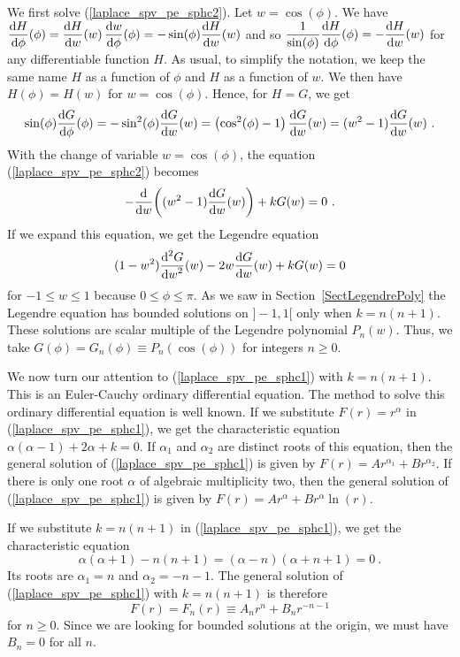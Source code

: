 \begin{egg}
We first solve (\ref{laplace_spv_pe_sphc2}).  Let $w = \cos(\phi)$.
We have \\
$\displaystyle \dydx{H}{\phi}(\phi) = \dydx{H}{w}(w)\, \dydx{w}{\phi}(\phi)
= -\sin(\phi) \dydx{H}{w}(w)$
and so
$\displaystyle \frac{1}{\sin(\phi)} \dydx{H}{\phi}(\phi) = -\dydx{H}{w}(w)$
for any differentiable function $H$.  As usual, to simplify the notation, we
keep the same name $H$ as a function of $\phi$ and $H$ as a function of
$w$.  We then have $H(\phi) = H(w)$ for $w=\cos(\phi)$.
Hence, for $H=G$, we get
\[
\sin(\phi) \dydx{G}{\phi}(\phi) = - \sin^2(\phi) \dydx{G}{w}(w)
= \left( \cos^2(\phi) - 1 \right) \dydx{G}{w}(w)
= (w^2-1)  \dydx{G}{w}(w) \ .
\]
With the change of variable $w = \cos(\phi)$, the equation
(\ref{laplace_spv_pe_sphc2}) becomes
\[
- \dfdx{ \left( (w^2-1) \dydx{G}{w}(w) \right) }{w} + k G(w) = 0 \ .
\]
If we expand this equation, we get the Legendre equation
\[
(1-w^2) \dydxn{G}{w}{2}(w) -2 w \dydx{G}{w}(w) + k G(w) = 0
\]
for $-1 \leq w \leq 1$ because $0 \leq \phi \leq \pi$.  As we saw in
Section~\ref{SectLegendrePoly}
the Legendre equation has bounded solutions on $]-1,1[$ only when
$k=n(n+1)$.  These solutions are scalar
multiple of the Legendre polynomial $P_n(w)$. Thus, we take
$G(\phi) = G_n(\phi) \equiv P_n(\cos(\phi))$ for integers $n \geq 0$.

We now turn our attention to (\ref{laplace_spv_pe_sphc1}) with $k=n(n+1)$.
This is an Euler-Cauchy ordinary differential equation.  The method to
solve this ordinary differential equation is well known.  If we
substitute $F(r) = r^\alpha$ in
(\ref{laplace_spv_pe_sphc1}), we get the characteristic equation
$\alpha(\alpha-1) + 2 \alpha + k=0$.  If $\alpha_1$ and $\alpha_2$ are
distinct roots of this equation, then the general solution of
(\ref{laplace_spv_pe_sphc1}) is given by
$F(r) = A r^{\alpha_1} + B r^{\alpha_2}$.  If there is only one root
$\alpha$ of algebraic multiplicity two, then the general solution of
(\ref{laplace_spv_pe_sphc1}) is given by
$F(r) = A r^{\alpha} + B r^{\alpha}\ln(r)$.

If we substitute $k=n(n+1)$ in (\ref{laplace_spv_pe_sphc1}), we get
the characteristic equation
\[
\alpha(\alpha+1) - n(n+1) = (\alpha-n)(\alpha+n+1) = 0 \ .
\]
Its roots are $\alpha_1 = n$ and $\alpha_2 = -n-1$.  The general
solution of (\ref{laplace_spv_pe_sphc1}) with $k=n(n+1)$ is therefore
\begin{equation} \label{laplace_spv_pe_sphc3}
F(r) = F_n(r) \equiv A_n r^n + B_n r^{-n-1}
\end{equation}
for $n \geq 0$.  Since we are looking for bounded solutions at the
origin, we must have $B_n = 0$ for all $n$.


\end{egg}
